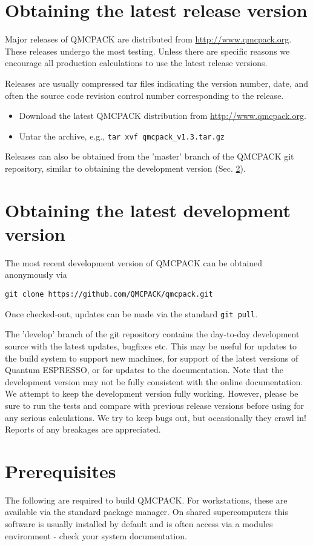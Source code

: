 \section{Obtaining the latest release version}
\label{sec:obrelease} 
Major releases of QMCPACK are distributed from
\url{http://www.qmcpack.org}. These releases undergo the most testing. Unless there are
specific reasons we encourage all production calculations to use the
latest release versions.

Releases are usually compressed tar files indicating the version
number, date, and often the source code revision control number
corresponding to the release.

\begin{itemize}
\item Download the latest QMCPACK distribution from \url{http://www.qmcpack.org}.
\item Untar the archive, e.g., \texttt{tar xvf qmcpack\_v1.3.tar.gz}
\end{itemize}

Releases can also be obtained from the 'master' branch of the QMCPACK
git repository, similar to obtaining the development version (Sec. \ref{sec:obdevelopment}).

\section{Obtaining the latest development version}
\label{sec:obdevelopment}
The most recent development version of QMCPACK can be obtained anonymously via 
\begin{verbatim}
git clone https://github.com/QMCPACK/qmcpack.git
\end{verbatim}
Once checked-out,
updates can be made via the standard \texttt{git pull}.

The 'develop' branch of the git repository contains the day-to-day development source
with the latest updates, bugfixes etc. This may be useful
for updates to the build system to support new machines, for support
of the latest versions of Quantum ESPRESSO, or for updates to the
documentation.  Note that the development version may not be fully
consistent with the online documentation.  We attempt to keep
the development version fully working. However, please be sure to run the tests and
compare with previous release versions before using for any serious
calculations. We try to keep bugs out, but occasionally they crawl
in! Reports of any breakages are appreciated.

\section{Prerequisites}
\label{sec:prerequisites}
The following are required to build QMCPACK. For workstations, these are available via the standard
package manager. On shared supercomputers this software is usually
installed by default and is often
access via a modules environment - check your system
documentation.

